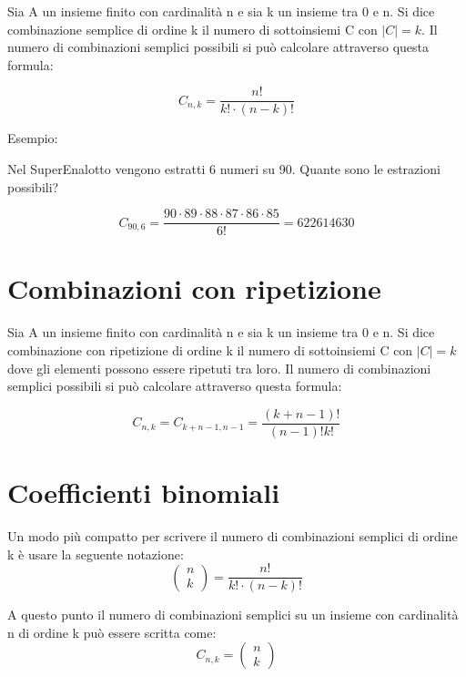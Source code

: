 \documentclass[a4paper, 10pt]{article}
\begin{document}
Sia A un insieme finito con cardinalità n e sia k un insieme tra 0 e n. Si dice combinazione semplice di ordine k il numero di sottoinsiemi C con $|C|=k$. Il numero di combinazioni semplici possibili si può calcolare attraverso questa formula:

$$C_{n,k}=\frac{n!}{k! \cdot (n-k)!}$$

Esempio:

Nel SuperEnalotto vengono estratti 6 numeri su 90. Quante sono le estrazioni possibili?

$$C_{90,6} = \frac{90 \cdot 89 \cdot 88 \cdot 87 \cdot 86 \cdot 85}{6!} = 622614630$$

\section{Combinazioni con ripetizione}

Sia A un insieme finito con cardinalità n e sia k un insieme tra 0 e n. Si dice combinazione con ripetizione di ordine k il numero di sottoinsiemi C con $|C|=k$ dove gli elementi possono essere ripetuti tra loro. Il numero di combinazioni semplici possibili si può calcolare attraverso questa formula:

$$C_{n,k}=C_{k+n-1,n-1}=\frac{(k+n-1)!}{(n-1)!k!}$$


\section{Coefficienti binomiali}

Un modo più compatto per scrivere il numero di combinazioni semplici di ordine k è usare la seguente notazione:
$$ \begin{pmatrix}
	n \\
	k 
\end{pmatrix}= \frac{n!}{k! \cdot (n-k)!} $$

A questo punto il numero di combinazioni semplici su un insieme con cardinalità n di ordine k può essere scritta come: $$ C_{n,k} = \begin{pmatrix}
	n \\
	k 
\end{pmatrix}$$
\end{document}
